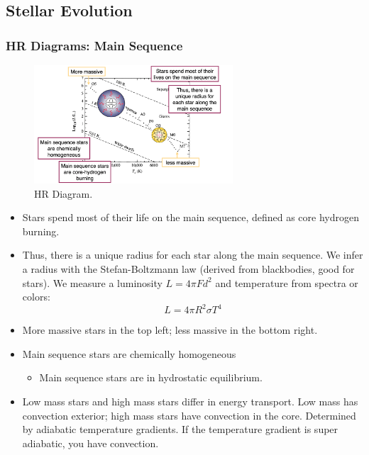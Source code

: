 \documentclass{article}
\begin{document}
\subsection{Stellar Evolution}

\subsubsection{HR Diagrams: Main Sequence}

\begin{figure}
    \centering
    \includegraphics[width=0.66\textwidth]{figs/Screen Shot 2021-09-15 at 9.04.35 AM.png}
    \caption{HR Diagram.}
    \label{fig:HR}
\end{figure}

\begin{itemize}
    \item Stars spend most of their life on the main sequence, defined as core hydrogen burning. 
    \item Thus, there is a unique radius for each star along the main sequence. We infer a radius with the Stefan-Boltzmann law (derived from blackbodies, good for stars). We measure a luminosity $L = 4\pi Fd^2$ and temperature from spectra or colors:
    \begin{equation}
        L = 4\pi R^2 \sigma T^4
    \end{equation}
    \item More massive stars in the top left; less massive in the bottom right. 
    \item Main sequence stars are chemically homogeneous
    \begin{itemize}
        \item Main sequence stars are in hydrostatic equilibrium.
    \end{itemize}
    \item Low mass stars and high mass stars differ in energy transport. Low mass has convection exterior; high mass stars have convection in the core. Determined by adiabatic temperature gradients. If the temperature gradient is super adiabatic, you have convection. 
\end{itemize}
\end{document}
